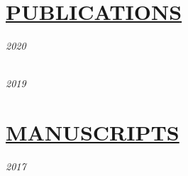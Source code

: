 \documentclass[11pt]{article}
\begin{document}
\section*{\centering\underline{PUBLICATIONS}}
\noindent\textit{2020} \begin{NoHyper}\end{NoHyper}\\[5mm] %
\noindent\textit{2019} \begin{NoHyper}\end{NoHyper}
\vspace{20mm} %

%
\section*{\centering\underline{MANUSCRIPTS}}
\noindent\textit{2017} \begin{NoHyper}\end{NoHyper}
\vspace{20mm} %

%
\end{document}

